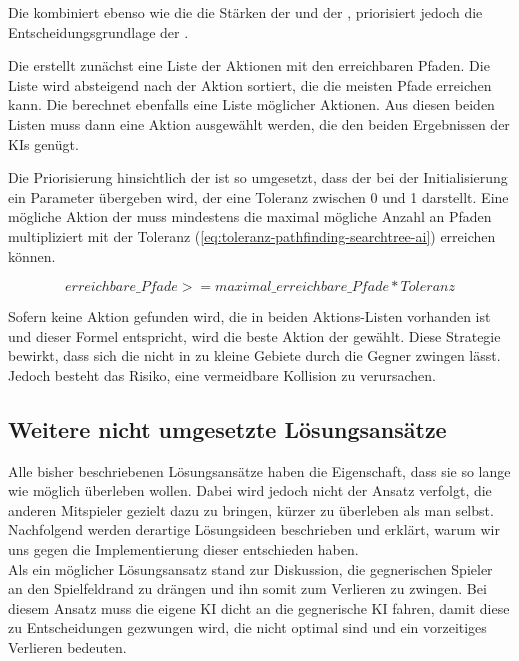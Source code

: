 Die  kombiniert ebenso wie die  die Stärken der
 und der , priorisiert jedoch die Entscheidungsgrundlage der
.

Die  erstellt zunächst eine Liste der Aktionen mit den erreichbaren Pfaden.
Die Liste wird absteigend nach der Aktion sortiert, die die meisten Pfade erreichen kann.
Die  berechnet ebenfalls eine Liste möglicher Aktionen.
Aus diesen beiden Listen muss dann eine Aktion ausgewählt werden, die den beiden Ergebnissen der \ac{KI}s genügt.

Die Priorisierung hinsichtlich der  ist so umgesetzt, dass der  bei
der Initialisierung ein Parameter übergeben wird, der eine Toleranz zwischen 0 und 1 darstellt.
Eine mögliche Aktion der  muss mindestens die maximal mögliche Anzahl an Pfaden multipliziert mit der
Toleranz (\ref{eq:toleranz-pathfinding-searchtree-ai}) erreichen können.

\begin{equation}
\label{eq:toleranz-pathfinding-searchtree-ai}
erreichbare\_Pfade >= maximal\_erreichbare\_Pfade * Toleranz
\end{equation}

Sofern keine Aktion gefunden wird, die in beiden Aktions-Listen vorhanden ist und dieser Formel entspricht, wird die
beste Aktion der  gewählt.
Diese Strategie bewirkt, dass sich die  nicht in zu kleine Gebiete durch die Gegner
zwingen lässt.
Jedoch besteht das Risiko, eine vermeidbare Kollision zu verursachen.

\subsection{Weitere nicht umgesetzte Lösungsansätze}
\label{subsec:weitere-loesungsansaetze}

Alle bisher beschriebenen Lösungsansätze haben die Eigenschaft, dass sie so lange wie möglich überleben wollen.
Dabei wird jedoch nicht der Ansatz verfolgt, die anderen Mitspieler gezielt dazu zu bringen, kürzer zu überleben als man
selbst.
Nachfolgend werden derartige Lösungsideen beschrieben und erklärt, warum wir uns gegen die Implementierung dieser
entschieden haben. \\

Als ein möglicher Lösungsansatz stand zur Diskussion, die gegnerischen Spieler an den Spielfeldrand zu drängen und ihn
somit zum Verlieren zu zwingen.
Bei diesem Ansatz muss die eigene KI dicht an die gegnerische \ac{KI} fahren, damit diese zu Entscheidungen gezwungen
wird, die nicht optimal sind und ein vorzeitiges Verlieren bedeuten.

